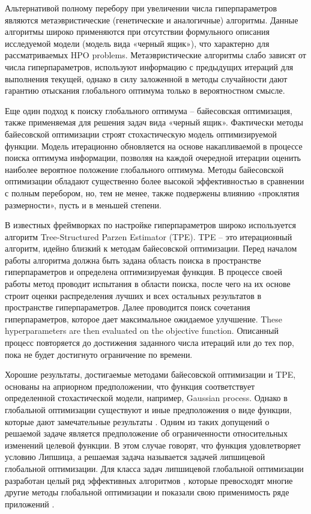 \documentclass[preprint,12pt]{elsarticle}
\begin{document}
Альтернативой полному перебору при увеличении числа гиперпараметров являются метаэвристические (генетические и аналогичные) алгоритмы. Данные алгоритмы широко применяются при отсутствии формульного описания исследуемой модели (модель вида «черный ящик»), что характерно для рассматриваемых HPO problems. Метаэвристические алгоритмы слабо зависят от числа гиперпараметров, используют информацию с предыдущих итераций для выполнения текущей, однако в силу заложенной в методы случайности дают гарантию отыскания глобального оптимума только в вероятностном смысле.

Еще один подход к поиску глобального оптимума -- байесовская оптимизация, также применяемая для решения задач вида «черный ящик». Фактически методы байесовской оптимизации строят стохастическую модель оптимизируемой функции. Модель итерационно обновляется на основе накапливаемой в процессе поиска оптимума информации, позволяя на каждой очередной итерации оценить наиболее вероятное положение глобального оптимума. Методы байесовской оптимизации обладают существенно более высокой эффективностью в сравнении с полным перебором, но, тем не менее, также подвержены влиянию «проклятия размерности», пусть и в меньшей степени.

В известных фреймворках по настройке гиперпараметров широко используется алгоритм Tree-Structured Parzen Estimator (TPE). TPE -- это итерационный алгоритм, идейно близкий к методам байесовской оптимизации. Перед началом работы алгоритма должна быть задана область поиска в пространстве гиперпараметров и определена оптимизируемая функция. В процессе своей работы метод проводит испытания в области поиска, после чего на их основе строит оценки распределения лучших и всех остальных результатов в пространстве гиперпараметров. Далее проводится поиск сочетания гиперпараметров, которое дает максимальное ожидаемое улучшение. These hyperparameters are then evaluated on the objective function. Описанный процесс повторяется до достижения заданного числа итераций или до тех пор, пока не будет достигнуто ограничение по времени.

Хорошие результаты, достигаемые методами байесовской оптимизации и TPE, основаны на априорном предположении, что функция соответствует определенной стохастической модели, например, Gaussian process. Однако в глобальной оптимизации существуют и иные предположения о виде функции, которые дают замечательные результаты
.
Одним из таких допущений о решаемой задаче является предположение об ограниченности относительных изменений целевой функции. В этом случае говорят, что функция удовлетворяет условию Липшица, а решаемая задача называется задачей липшицевой глобальной оптимизации. Для класса задач липшицевой глобальной оптимизации разработан целый ряд эффективных алгоритмов \cite{Jones2021,Paulavicius2020,Strongin2020,Sergeyev2017,PaulaviciusZilinskas2014}, которые превосходят многие другие методы глобальной оптимизации \cite{Sergeyev2018} и показали свою применимость ряде приложений \cite{Kvasov2008,CANDELIERI2019,Gubaydullin2021}.
 
\end{document}
